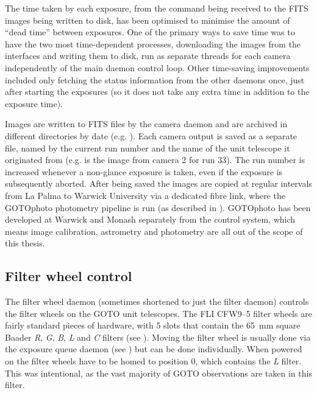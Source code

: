 \begin{colsection}
The time taken by each exposure, from the command being received to the FITS images being written to disk, has been optimised to minimise the amount of ``dead time'' between exposures. One of the primary ways to save time was to have the two most time-dependent processes, downloading the images from the interfaces and writing them to disk, run as separate threads for each camera independently of the main daemon control loop. Other time-saving improvements included only fetching the status information from the other daemons once, just after starting the exposures (so it does not take any extra time in addition to the exposure time).

Images are written to FITS files by the camera daemon and are archived in different directories by date (e.g. ). Each camera output is saved as a separate file, named by the current run number and the name of the unit telescope it originated from (e.g.  is the image from camera 2 for run 33). The run number is increased whenever a non-glance exposure is taken, even if the exposure is subsequently aborted. After being saved the images are copied at regular intervals from La Palma to Warwick University via a dedicated fibre link, where the GOTOphoto photometry pipeline is run (as described in ). GOTOphoto has been developed at Warwick and Monash separately from the control system, which means image calibration, astrometry and photometry are all out of the scope of this thesis.

\newpage

\end{colsection}


\subsection{Filter wheel control}
\label{sec:filt}
\begin{colsection}

The filter wheel daemon (sometimes shortened to just the filter daemon) controls the filter wheels on the GOTO unit telescopes. The FLI CFW9--5 filter wheels are fairly standard pieces of hardware, with 5 slots that contain the \SI{65}{\milli\metre} square Baader \textit{R}, \textit{G}, \textit{B}, \textit{L} and \textit{C} filters (see ). Moving the filter wheel is usually done via the exposure queue daemon (see ) but can be done individually. When powered on the filter wheels have to be homed to position 0, which contains the \textit{L} filter. This was intentional, as the vast majority of GOTO observations are taken in this filter.

\end{colsection}

